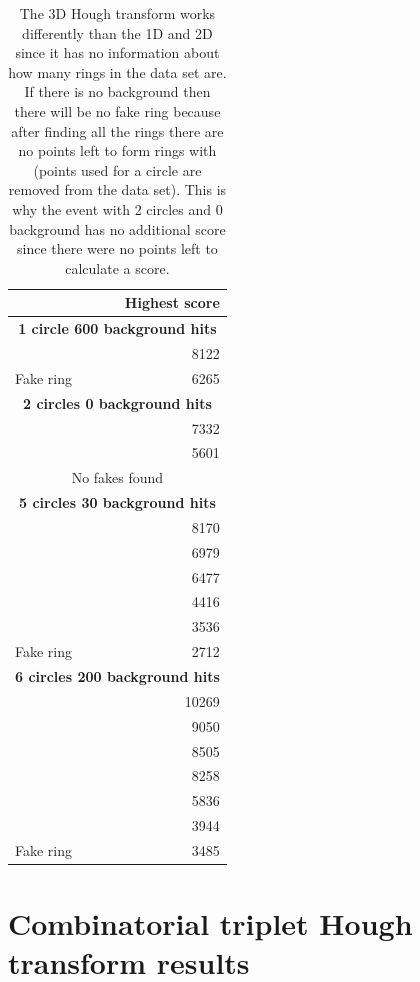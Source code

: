 \documentclass[11pt,twoside]{scrreprt}
\begin{document}
\begin{table}[tbp]
  \caption[3D Hough transform scores]{The 3D Hough transform works differently than the 1D and 2D since it has no information about how many rings in the data set are. If there is no background then there will be no fake ring because after finding all the rings there are no points left to form rings with (points used for a circle are removed from the data set). This is why the event with 2 circles and 0 background has no additional score since there were no points left to calculate a score.}
  \label{tab:3d_scores}
  \centering

  \begin{tabular}{p{5cm}r}
  \toprule
   & \textbf{Highest score}  \\
  \midrule
  \midrule
  \multicolumn{2}{c}{\textbf{1 circle 600 background hits}} \\
  & 8122 \\
  Fake ring & 6265\\
  \midrule
  \multicolumn{2}{c}{\textbf{2 circles 0 background hits}}\\
   & 7332 \\
   & 5601 \\
   \multicolumn{2}{c}{No fakes found}\\
  \midrule
  \multicolumn{2}{c}{\textbf{5 circles 30 background hits}}\\
  & 8170 \\
  & 6979 \\
  & 6477 \\
  & 4416 \\
  & 3536 \\
  Fake ring & 2712 \\
  \midrule
  \multicolumn{2}{c}{\textbf{6 circles 200 background hits}}\\
  & 10269 \\
  & 9050 \\
  & 8505 \\
  & 8258 \\
  & 5836 \\
  & 3944 \\
  Fake ring & 3485 \\
   \bottomrule
  \end{tabular}
\end{table}



\newpage
\section{Combinatorial triplet Hough transform results} %
\label{sec:combinatorial_approach_results}
\end{document}
